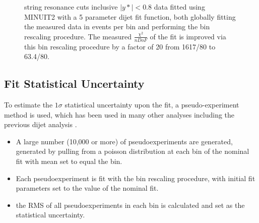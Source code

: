 \begin{figure}[!htb]
  \centering
  \caption{string resonance cuts inclusive $|y*|<0.8$ data fitted using MINUIT2 with a 5 parameter dijet fit function, both globally fitting the measured data in events per bin and performing the bin rescaling procedure. The measured $\frac{\chi^{2}}{nDoF}$ of the fit is improved via this bin rescaling procedure by a factor of 20 from 1617/80 to 63.4/80.}
  \label{fig:5ParamGlobalFitBinRescaleComparison}
\end{figure}

\subsection{Fit Statistical Uncertainty}

To estimate the $1\sigma$ statistical uncertainty upon the fit, a pseudo-experiment method is used, which has been used in many other analyses including the previous dijet analysis \cite{ATL-COM-PHYS-2018-1538}.

\begin{itemize}
    \item A large number (10,000 or more) of pseudoexperiments are generated, generated by pulling from a poisson distribution at each bin of the nominal fit with mean set to equal the bin.
    \item Each pseudoexperiment is fit with the bin rescaling procedure, with initial fit parameters set to the value of the nominal fit.
    \item the RMS of all pseudoexperiments in each bin is calculated and set as the statistical uncertainty.
\end{itemize}

